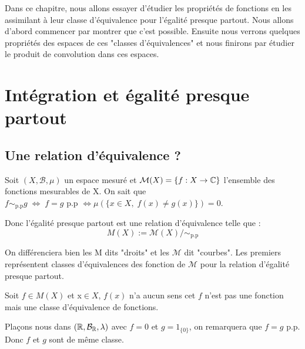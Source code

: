 \minitoc  %


Dans ce chapitre, nous allons essayer d'étudier les propriétés de fonctions en les assimilant à leur classe d'équivalence 
pour l'égalité presque partout. Nous allons d'abord commencer par montrer que c'est possible. Ensuite nous verrons quelques propriétés
des espaces de ces "classes d'équivalences" et nous finirons par étudier le produit de convolution dans ces espaces. 


\section{Intégration et égalité presque partout}

\subsection{Une relation d'équivalence ?}

Soit $(X,\mathcal{B},\mu)$ un espace mesuré et $\mathcal{M}(X) = \{f : X \rightarrow \mathbb{C}\}$ l'ensemble des fonctions mesurables 
de X. On sait que $ f \sim_{\text{p.p}} g \; \Longleftrightarrow \; f = g \text{ p.p } \Longleftrightarrow \mu (\{ x \in X, \; f(x) \not = g(x) \}) = 0 $. 

Donc l'égalité presque partout est une relation d'équivalence telle que :
    \[ M(X) := \mathcal{M}(X) / \sim_{\text{p.p}} \] 

On différenciera bien les M dits "droits" et les $\mathcal{M}$ dit "courbes". 
Les premiers représentent classes d'équivalences des fonction de $\mathcal{M}$ pour la relation d'égalité presque partout. 

\begin{remark}
    Soit $f \in M(X)$ et x$ \in X$, $f(x)$ n'a aucun sens cet $f$ n'est pas une fonction mais une classe d'équivalence de fonctions. 
\end{remark}

\begin{example}
    Plaçons nous dans $(\mathbb{R},\mathcal{B}_{\mathbb{R}},\lambda)$ avec $f = 0$ et $g = 1_{\{0\}}$, on remarquera que $f = g$ p.p. 
    Donc $f$ et $g$ sont de même classe. 
\end{example}

